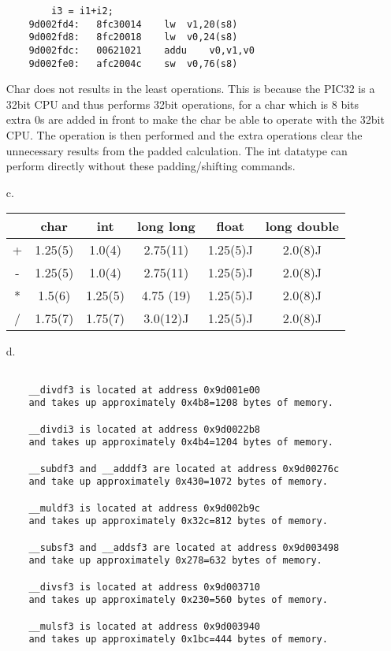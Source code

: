\documentclass[12pt]{article}
\begin{document}
\begin{itemize}
    \begin{verbatim}
        i3 = i1+i2;
    9d002fd4:	8fc30014 	lw	v1,20(s8)
    9d002fd8:	8fc20018 	lw	v0,24(s8)
    9d002fdc:	00621021 	addu	v0,v1,v0
    9d002fe0:	afc2004c 	sw	v0,76(s8)
    \end{verbatim}

    Char does not results in the least operations.
    This is because the PIC32 is a 32bit CPU and thus performs 32bit operations, for a char which is 8 bits extra 0s are added in front to make the char be able to operate with the 32bit CPU.
    The operation is then performed and the extra operations clear the unnecessary results from the padded calculation.
    The int datatype can perform directly without these padding/shifting commands.

    \item[c.]
    \begin{tabular}{|c|c|c|c|c|c|}
        \hline
        & char & int & long long & float & long double \\
        \hline
        + & 1.25(5) & 1.0(4) & 2.75(11) & 1.25(5)J&  2.0(8)J\\
        \hline
        - & 1.25(5) & 1.0(4) & 2.75(11) & 1.25(5)J&  2.0(8)J\\
        \hline
        * & 1.5(6) & 1.25(5) & 4.75 (19) & 1.25(5)J&  2.0(8)J\\
        \hline
        / & 1.75(7) & 1.75(7) & 3.0(12)J & 1.25(5)J&  2.0(8)J\\
        \hline
        
    \end{tabular}

    \item[d.]

    \begin{verbatim}

    __divdf3 is located at address 0x9d001e00 
    and takes up approximately 0x4b8=1208 bytes of memory.

    __divdi3 is located at address 0x9d0022b8 
    and takes up approximately 0x4b4=1204 bytes of memory.

    __subdf3 and __adddf3 are located at address 0x9d00276c 
    and take up approximately 0x430=1072 bytes of memory.

    __muldf3 is located at address 0x9d002b9c 
    and takes up approximately 0x32c=812 bytes of memory.

    __subsf3 and __addsf3 are located at address 0x9d003498 
    and take up approximately 0x278=632 bytes of memory.

    __divsf3 is located at address 0x9d003710 
    and takes up approximately 0x230=560 bytes of memory.

    __mulsf3 is located at address 0x9d003940 
    and takes up approximately 0x1bc=444 bytes of memory.

    \end{verbatim}

    \end{itemize}
\end{document}
